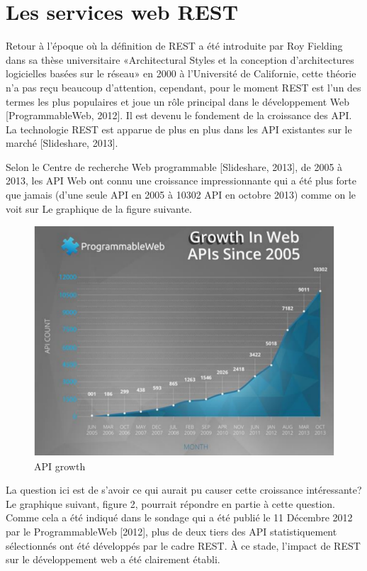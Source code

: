 \chapter{Les services web REST}

Retour à l'époque où la définition de REST a été introduite par Roy Fielding dans sa thèse universitaire «Architectural Styles et la conception d'architectures logicielles basées sur le réseau» en 2000 à l'Université de Californie, cette théorie n'a pas reçu beaucoup d'attention, cependant, pour le moment REST est l'un des termes les plus populaires et joue un rôle principal dans le développement Web [ProgrammableWeb, 2012]. Il est devenu le fondement de la croissance des API. La technologie REST est apparue de plus en plus dans les API existantes sur le marché [Slideshare, 2013].

Selon le Centre de recherche Web programmable [Slideshare, 2013], de 2005 à 2013, les API Web ont connu une croissance impressionnante qui a été plus forte que jamais (d'une seule API en 2005 à 10302 API en octobre 2013) comme on le voit sur Le graphique de la figure suivante.
\begin{figure}[! ht ]
			\centering
			\includegraphics[scale=.4]{./images/api_growth.png}
			\caption {API growth}
		\end{figure}
		
La question ici est de s'avoir ce qui aurait pu causer cette croissance intéressante? Le graphique suivant, figure 2, pourrait répondre en partie à cette question. Comme cela a été indiqué dans le sondage qui a été publié le 11 Décembre 2012 par le ProgrammableWeb [2012], plus de deux tiers des API statistiquement sélectionnés ont été développés par le cadre REST. À ce stade, l'impact de REST sur le développement web a été clairement établi.

